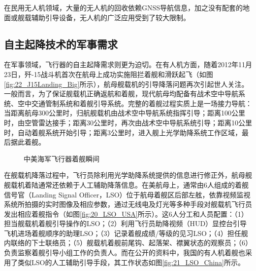 在民用无人机领域，大量的无人机的回收依赖GNSS导航信息，加之没有配套的地面或舰载辅助引导设备，无人机的广泛应用受到了较大限制。

\subsection{自主起降技术的军事需求}
在军事领域，飞行器的自主起降需求则更为迫切。在有人机方面，随着2012年11月23日，歼-15战斗机首次在航母上成功实施阻拦着舰和滑跃起飞（如图\ref{fig:22_J15Landing_Big}所示），航母舰载机的引导降落问题再次引起世人关注。一般而言，为了保证舰载机正确返航和着舰，现代航母均配备有战术空中导航系统、空中交通管制系统和着舰引导系统。完整的着舰过程实质上是一场接力导航：当距离航母300公里时，归航舰载机由战术空中导航系统指挥引导；距离100公里时，由空管雷达接手；距离30公里时，再次由战术空中导航系统引导；距离10公里时，自动着舰系统开始引导；距离3公里时，进入舰上光学助降系统工作区域，最后据此着舰。

\begin{figure}[htb]
	\centering%
	\hspace{0.7em}%
	\caption{中美海军飞行器着舰瞬间}
	\label{fig:01_Landing}
\end{figure}

在舰载机降落过程中，飞行员除利用光学助降系统提供的信息进行修正外，航母舰舰载机着陆通常还依赖于人工辅助降落信息。在美航母上，通常由6人组成的着舰信号官（Landing Signal Officer，LSO）位于航母着舰区后部左舷，依靠视频监视系统所拍摄的实时图像及相应参数，通过无线电及灯光等多种手段对舰载机飞行员发出相应着舰指令（如图\ref{fig:20_LSO_USA}所示）。这6人分工和人员配置：（1）担当舰载机着舰引导操作的LSO；（2）利用飞行员助降视频（HUD）显控台引导飞机进场着舰顺序的助理LSO；（3）记录着舰成绩/等级的见习LSO；（4）担任舰内联络的下士联络员；（5）舰载机着舰前尾钩、起落架、襟翼状态的观察员；（6）负责监察着舰引导小组工作的负责人。而在公开的资料中，我国的有人机着舰也采用了类似LSO的人工辅助引导手段，其工作状态如图\ref{fig:21_LSO_China}所示。

